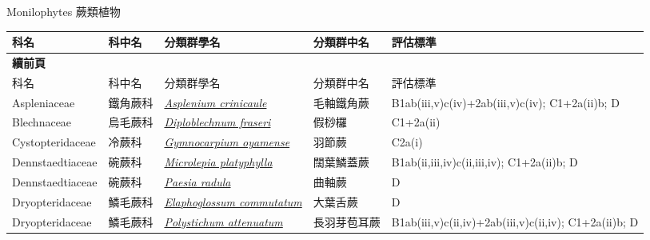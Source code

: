 \noindent\normalfont\selectfont Monilophytes 蕨類植物
\footnotesize\selectfont
        {\def\arraystretch{1.5}\tabcolsep=2pt
        \begin{longtable}{p{2.5cm}p{2.5cm}p{4.5cm}p{2.5cm}p{3cm}}
        \toprule
          科名 & 科中名 & 分類群學名 & 分類群中名 & 評估標準 \\
        \midrule 
        \endfirsthead

        {{\bfseries 續前頁 }} \\
        科名 & 科中名 & 分類群學名 & 分類群中名 & 評估標準 \\
        \midrule
        \endhead
                Aspleniaceae & 鐵角蕨科 & \href{http://www.theplantlist.org/tpl1.1/search?q=Asplenium+crinicaule}{\textit{Asplenium crinicaule} } & 毛軸鐵角蕨 & B1ab(iii,v)c(iv)+2ab(iii,v)c(iv); C1+2a(ii)b; D \index{Asplenium@\textit{Asplenium}!crinicaule@\textit{crinicaule}}  \index{毛軸鐵角蕨} \\
    Blechnaceae & 烏毛蕨科 & \href{http://www.theplantlist.org/tpl1.1/search?q=Diploblechnum+fraseri}{\textit{Diploblechnum fraseri} } & 假桫欏 & C1+2a(ii) \index{Diploblechnum@\textit{Diploblechnum}!fraseri@\textit{fraseri}}  \index{假桫欏} \\
    Cystopteridaceae & 冷蕨科 & \href{http://www.theplantlist.org/tpl1.1/search?q=Gymnocarpium+oyamense}{\textit{Gymnocarpium oyamense} } & 羽節蕨 & C2a(i) \index{Gymnocarpium@\textit{Gymnocarpium}!oyamense@\textit{oyamense}}  \index{羽節蕨} \\
    Dennstaedtiaceae & 碗蕨科 & \href{http://www.theplantlist.org/tpl1.1/search?q=Microlepia+platyphylla}{\textit{Microlepia platyphylla} } & 闊葉鱗蓋蕨 & B1ab(ii,iii,iv)c(ii,iii,iv); C1+2a(ii)b; D \index{Microlepia@\textit{Microlepia}!platyphylla@\textit{platyphylla}}  \index{闊葉鱗蓋蕨} \\
    Dennstaedtiaceae & 碗蕨科 & \href{http://www.theplantlist.org/tpl1.1/search?q=Paesia+radula}{\textit{Paesia radula} } & 曲軸蕨 & D \index{Paesia@\textit{Paesia}!radula@\textit{radula}}  \index{曲軸蕨} \\
    Dryopteridaceae & 鱗毛蕨科 & \href{http://www.theplantlist.org/tpl1.1/search?q=Elaphoglossum+commutatum}{\textit{Elaphoglossum commutatum} } & 大葉舌蕨 & D \index{Elaphoglossum@\textit{Elaphoglossum}!commutatum@\textit{commutatum}}  \index{大葉舌蕨} \\
    Dryopteridaceae & 鱗毛蕨科 & \href{http://www.theplantlist.org/tpl1.1/search?q=Polystichum+attenuatum}{\textit{Polystichum attenuatum} } & 長羽芽苞耳蕨 & B1ab(iii,v)c(ii,iv)+2ab(iii,v)c(ii,iv); C1+2a(ii)b; D \index{Polystichum@\textit{Polystichum}!attenuatum@\textit{attenuatum}}  \index{長羽芽苞耳蕨} \\

\end{longtable}}
